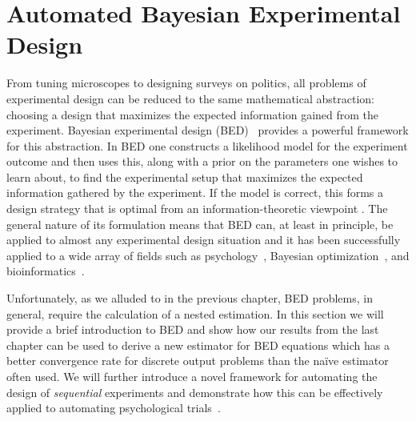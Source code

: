 
\chapter{Automated Bayesian Experimental Design}
\label{chp:design}

From tuning microscopes to designing surveys on politics, all problems of 
experimental design can be reduced to the same mathematical abstraction:
choosing a design that maximizes the expected information gained from the 
experiment.
Bayesian experimental design (BED)~\citep{chaloner1995bayesian,sebastiani2000maximum} 
provides a powerful framework for this abstraction.  In BED
one constructs a likelihood model for the experiment outcome and then uses this, along
with a prior on the parameters one wishes to learn about, to find the experimental setup
that maximizes the expected information gathered by the experiment.  
If the model is correct, this forms a design strategy that is optimal from
an information-theoretic viewpoint \citep{sebastiani2000maximum}.  
The general nature of its formulation means that BED can, at least in principle, be applied
to almost any experimental design situation and it has been successfully applied to a wide
array of fields such as psychology~\citep{myung2013tutorial,Cavagnaro:discounting,vincent2017darc},
Bayesian optimization~\citep{hennig2012entropy,hernandez2014predictive}, and
bioinformatics~\citep{vanlier2012bayesian}.

Unfortunately, as we alluded to in the previous chapter, BED problems, in
general,  require the calculation of a nested estimation.
In this section we will provide a brief introduction to BED and show how our results
from the last chapter can be used to derive a new estimator for BED equations 
which has a better convergence rate for discrete output problems than the na\"{i}ve
estimator often used.  We will further introduce a novel framework for automating the
design of \emph{sequential} experiments and demonstrate how this can be
effectively applied to automating psychological trials~\citep{vincent2017darc}.  




